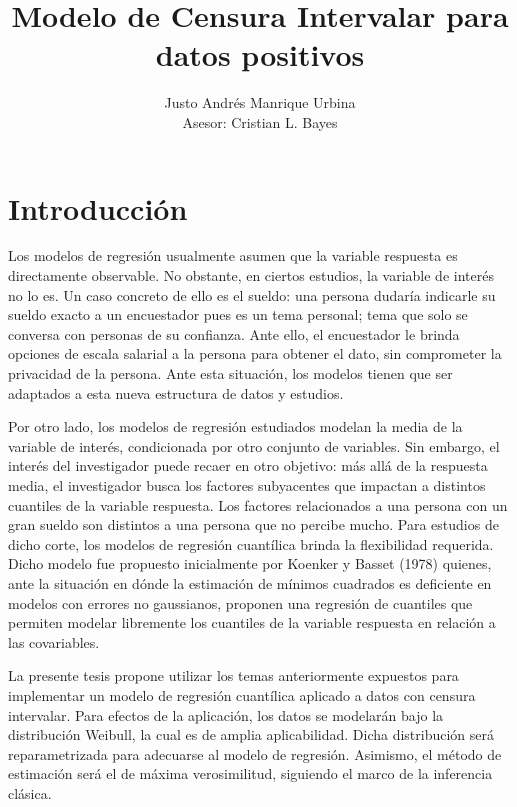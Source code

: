 \documentclass{report}
\title{Modelo de Censura Intervalar para datos positivos}
\author{Justo Andrés Manrique Urbina \\ Asesor: Cristian L. Bayes}
\begin{document}
\maketitle



\tableofcontents{}

\chapter{Introducción}

Los modelos de regresión usualmente asumen que la variable respuesta es directamente observable. No obstante, en ciertos estudios, la variable de interés no lo es. Un caso concreto de ello es el sueldo: una persona dudaría indicarle su sueldo exacto a un encuestador pues es un tema personal; tema que solo se conversa con personas de su confianza. Ante ello, el encuestador le brinda opciones de escala salarial a la persona para obtener el dato, sin comprometer la privacidad de la persona. Ante esta situación, los modelos tienen que ser adaptados a esta nueva estructura de datos y estudios.

Por otro lado, los modelos de regresión estudiados modelan la media de la variable de interés, condicionada por otro conjunto de variables. Sin embargo, el interés del investigador puede recaer en otro objetivo: más allá de la respuesta media, el investigador busca los factores subyacentes que impactan a distintos cuantiles de la variable respuesta. Los factores relacionados a una persona con un gran sueldo son distintos a una persona que no percibe mucho. Para estudios de dicho corte, los modelos de regresión cuantílica brinda la flexibilidad requerida. Dicho modelo fue propuesto inicialmente por Koenker y Basset (1978) quienes, ante la situación en dónde la estimación de mínimos cuadrados es deficiente en modelos con errores no gaussianos, proponen una regresión de cuantiles que permiten modelar libremente los cuantiles de la variable respuesta en relación a las covariables.

La presente tesis propone utilizar los temas anteriormente expuestos para implementar un modelo de regresión cuantílica aplicado a datos con censura intervalar. Para efectos de la aplicación, los datos se modelarán bajo la distribución Weibull, la cual es de amplia aplicabilidad. Dicha distribución será reparametrizada para adecuarse al modelo de regresión. Asimismo, el método de estimación será el de máxima verosimilitud,  siguiendo el marco de la inferencia clásica.
\end{document}
